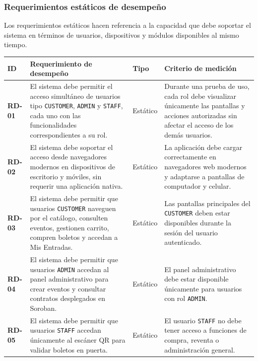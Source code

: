 \documentclass[12pt,letterpaper]{article}
\begin{document}
\subsubsection{Requerimientos estáticos de desempeño}
Los requerimientos estáticos hacen referencia a la capacidad que debe soportar el sistema en términos de usuarios, dispositivos y módulos disponibles al mismo tiempo.
\begin{table}[H]
\centering
\tiny
\renewcommand{\arraystretch}{1.05}
\setlength{\tabcolsep}{3pt}

\begin{tabularx}{\textwidth}{|p{1.3cm}|X|p{1.5cm}|X|}
\hline
\textbf{ID} & \textbf{Requerimiento de desempeño} & \textbf{Tipo} & \textbf{Criterio de medición} \\ \hline

\textbf{RD-01} & 
El sistema debe permitir el acceso simultáneo de usuarios tipo \texttt{CUSTOMER}, \texttt{ADMIN} y \texttt{STAFF}, cada uno con las funcionalidades correspondientes a su rol. & 
Estático & 
Durante una prueba de uso, cada rol debe visualizar únicamente las pantallas y acciones autorizadas sin afectar el acceso de los demás usuarios. \\ \hline

\textbf{RD-02} & 
El sistema debe soportar el acceso desde navegadores modernos en dispositivos de escritorio y móviles, sin requerir una aplicación nativa. & 
Estático & 
La aplicación debe cargar correctamente en navegadores web modernos y adaptarse a pantallas de computador y celular. \\ \hline

\textbf{RD-03} & 
El sistema debe permitir que usuarios \texttt{CUSTOMER} naveguen por el catálogo, consulten eventos, gestionen carrito, compren boletos y accedan a Mis Entradas. & 
Estático & 
Las pantallas principales del \texttt{CUSTOMER} deben estar disponibles durante la sesión del usuario autenticado. \\ \hline

\textbf{RD-04} & 
El sistema debe permitir que usuarios \texttt{ADMIN} accedan al panel administrativo para crear eventos y consultar contratos desplegados en Soroban. & 
Estático & 
El panel administrativo debe estar disponible únicamente para usuarios con rol \texttt{ADMIN}. \\ \hline

\textbf{RD-05} & 
El sistema debe permitir que usuarios \texttt{STAFF} accedan únicamente al escáner QR para validar boletos en puerta. & 
Estático & 
El usuario \texttt{STAFF} no debe tener acceso a funciones de compra, reventa o administración general. \\ \hline


\end{tabularx}
\end{table}
\end{document}
